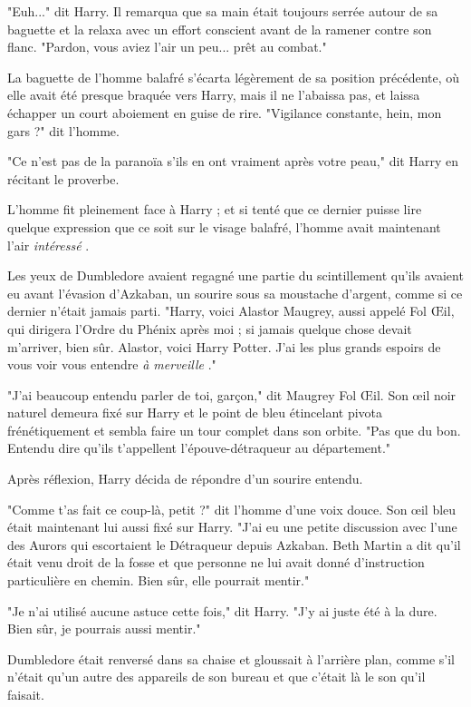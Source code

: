 "Euh..." dit Harry. Il remarqua que sa main était toujours serrée autour de sa baguette et la relaxa avec un effort conscient avant de la ramener contre son flanc. "Pardon, vous aviez l'air un peu... prêt au combat."

La baguette de l'homme balafré s'écarta légèrement de sa position précédente, où elle avait été presque braquée vers Harry, mais il ne l'abaissa pas, et laissa échapper un court aboiement en guise de rire. "Vigilance constante, hein, mon gars ?" dit l'homme.

"Ce n'est pas de la paranoïa s'ils en ont vraiment après votre peau," dit Harry en récitant le proverbe.

L'homme fit pleinement face à Harry ; et si tenté que ce dernier puisse lire quelque expression que ce soit sur le visage balafré, l'homme avait maintenant l'air \emph{intéressé} .

Les yeux de Dumbledore avaient regagné une partie du scintillement qu'ils avaient eu avant l'évasion d'Azkaban, un sourire sous sa moustache d'argent, comme si ce dernier n'était jamais parti. "Harry, voici Alastor Maugrey, aussi appelé Fol Œil, qui dirigera l'Ordre du Phénix après moi ; si jamais quelque chose devait m'arriver, bien sûr. Alastor, voici Harry Potter. J'ai les plus grands espoirs de vous voir vous entendre \emph{à merveille} ."

"J'ai beaucoup entendu parler de toi, garçon," dit Maugrey Fol Œil. Son œil noir naturel demeura fixé sur Harry et le point de bleu étincelant pivota frénétiquement et sembla faire un tour complet dans son orbite. "Pas que du bon. Entendu dire qu'ils t'appellent l'épouve-détraqueur au département."

Après réflexion, Harry décida de répondre d'un sourire entendu.

"Comme t'as fait ce coup-là, petit ?" dit l'homme d'une voix douce. Son œil bleu était maintenant lui aussi fixé sur Harry. "J'ai eu une petite discussion avec l'une des Aurors qui escortaient le Détraqueur depuis Azkaban. Beth Martin a dit qu'il était venu droit de la fosse et que personne ne lui avait donné d'instruction particulière en chemin. Bien sûr, elle pourrait mentir."

"Je n'ai utilisé aucune astuce cette fois," dit Harry. "J'y ai juste été à la dure. Bien sûr, je pourrais aussi mentir."

Dumbledore était renversé dans sa chaise et gloussait à l'arrière plan, comme s'il n'était qu'un autre des appareils de son bureau et que c'était là le son qu'il faisait.

